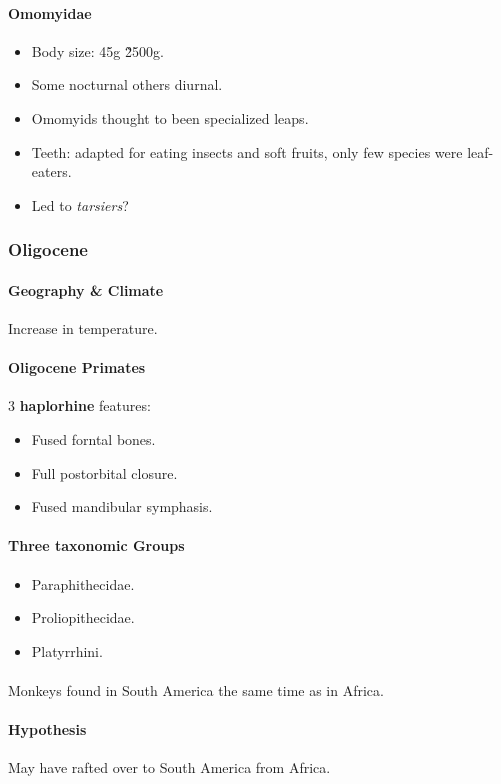 \documentclass{article}
\begin{document}
	\paragraph{Omomyidae}
	\begin{itemize}
		\item Body size: 45g \~ 2500g.
		\item Some nocturnal others diurnal.
		\item Omomyids thought to been specialized leaps.
		\item Teeth: adapted for eating insects and soft fruits, only few species were leaf-eaters.
		\item Led to \emph{tarsiers}?
	\end{itemize}

\subsubsection{Oligocene}
	\paragraph{Geography \& Climate} Increase in temperature.
	\paragraph{Oligocene Primates} 3 \textbf{haplorhine} features:
	\begin{itemize}
		\item Fused forntal bones.
		\item Full postorbital closure.
		\item Fused mandibular symphasis.
	\end{itemize}
	\paragraph{Three taxonomic Groups}
	\begin{itemize}
		\item Paraphithecidae.
		\item Proliopithecidae.
		\item Platyrrhini.
	\end{itemize}
	\paragraph{} Monkeys found in South America the same time as in Africa.
	\paragraph{Hypothesis} May have rafted over to South America from Africa.
\end{document}
